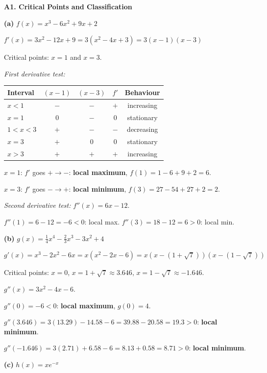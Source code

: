 \documentclass[12pt, a4paper]{article}
\theoremstyle{definition}
\begin{document}
\begin{solbox}
\textbf{A1. Critical Points and Classification}

\textbf{(a)} $f(x) = x^3-6x^2+9x+2$

$f'(x) = 3x^2-12x+9 = 3(x^2-4x+3) = 3(x-1)(x-3)$

Critical points: $x=1$ and $x=3$.

\emph{First derivative test:}

\smallskip
\begin{center}
\begin{tabular}{lcccc}
  \toprule
  \rowcolor{tabhead}
  \color{white}Interval & \color{white}$(x-1)$ & \color{white}$(x-3)$ & \color{white}$f'$ & \color{white}Behaviour \\
  \midrule
  $x<1$ & $-$ & $-$ & $+$ & increasing \\
  \rowcolor{tabeven}
  $x=1$ & $0$ & $-$ & $0$ & stationary \\
  $1<x<3$ & $+$ & $-$ & $-$ & decreasing \\
  \rowcolor{tabeven}
  $x=3$ & $+$ & $0$ & $0$ & stationary \\
  $x>3$ & $+$ & $+$ & $+$ & increasing \\
  \bottomrule
\end{tabular}
\end{center}

$x=1$: $f'$ goes $+\to-$: \textbf{local maximum}, $f(1)=1-6+9+2=6$.

$x=3$: $f'$ goes $-\to+$: \textbf{local minimum}, $f(3)=27-54+27+2=2$.

\emph{Second derivative test:} $f''(x) = 6x-12$.

$f''(1)=6-12=-6<0$: local max. \checkmark \quad $f''(3)=18-12=6>0$: local min. \checkmark

\medskip
\textbf{(b)} $g(x) = \frac{1}{4}x^4-\frac{2}{3}x^3-3x^2+4$

$g'(x) = x^3-2x^2-6x = x(x^2-2x-6) = x(x-(1+\sqrt{7}))(x-(1-\sqrt{7}))$

Critical points: $x=0$, $x=1+\sqrt{7}\approx 3.646$, $x=1-\sqrt{7}\approx -1.646$.

$g''(x) = 3x^2-4x-6$.

$g''(0) = -6 < 0$: \textbf{local maximum}, $g(0)=4$.

$g''(3.646) = 3(13.29)-14.58-6 = 39.88-20.58 = 19.3 > 0$: \textbf{local minimum}.

$g''(-1.646) = 3(2.71)+6.58-6 = 8.13+0.58 = 8.71 > 0$: \textbf{local minimum}.

\medskip
\textbf{(c)} $h(x) = xe^{-x}$


\end{solbox}
\end{document}
